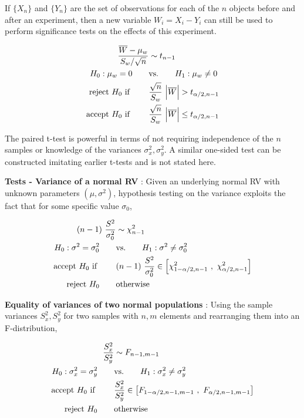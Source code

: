 If $ \{X_n\} $ and $ \{Y_n\} $ are the set of observations for each of the $ n $ objects before and after an experiment, then a new variable $ W_i = X_i - Y_i $ can still be used to perform significance tests on the effects of this experiment.

\begin{align}
	\frac{\overline{W} - \mu_w}{S_w / \sqrt{n}} &\sim t_{n-1} \nonumber \\
	H_0 : \mu_w = 0 \qquad &\text{vs.} \qquad H_1 : \mu_w \neq 0 \nonumber \\
	\text{reject $ H_0 $ if } \qquad & \frac{\sqrt{n}}{S_w}\ \Big| \overline{W} \Big| > t_{\alpha/2, n-1} \nonumber \\
	\text{accept $ H_0 $ if } \qquad & \frac{\sqrt{n}}{S_w}\ \Big| \overline{W} \Big| \leq t_{\alpha/2, n-1}
\end{align}

The paired t-test is powerful in terms of not requiring independence of the $ n $ samples or knowledge of the variances $ \sigma_x^2, \sigma_y^2 $. A similar one-sided test can be constructed imitating earlier t-tests and is not stated here.

\textbf{Tests - Variance of a normal RV} : Given an underlying normal RV with unknown parameters $ (\mu, \sigma^2) $, hypothesis testing on the variance exploits the fact that for some specific value $ \sigma_0 $,

\begin{align}
	(n-1)\ \frac{S^2}{\sigma_0^2} &\sim \chi^2_{n-1} \nonumber \\
	H_0 : \sigma^2 = \sigma_0^2 \qquad &\text{vs.} \qquad H_1 : \sigma^2 \neq \sigma_0^2 \\
	\text{accept $ H_0 $ if } \qquad & (n-1)\ \frac{S^2}{\sigma_0^2} \in \left[ \chi^2_{1 - \alpha/2, n-1}\ ,\ \chi^2_{\alpha/2, n-1} \right] \\
	\text{reject $ H_0 $} \qquad & \text{otherwise}
\end{align}

\textbf{Equality of variances of two normal populations} : Using the sample variances $ S_x^2, S_y^2 $ for two samples with $ n, m $ elements and rearranging them into an F-distribution,

\begin{align}
	\frac{S^2_x}{S^2_y} &\sim F_{n-1, m-1} \nonumber \\
	H_0 : \sigma_x^2 = \sigma_y^2 \qquad &\text{vs.} \qquad H_1 : \sigma_x^2 \neq \sigma_y^2 \nonumber \\
	\text{accept $ H_0 $ if } \qquad & \frac{S^2_x}{S^2_y} \in \left[ F_{1 - \alpha/2, n-1, m-1}\ ,\ F_{\alpha/2, n-1, m-1} \right] \nonumber \\
	\text{reject $ H_0 $} \qquad & \text{otherwise}
\end{align}

